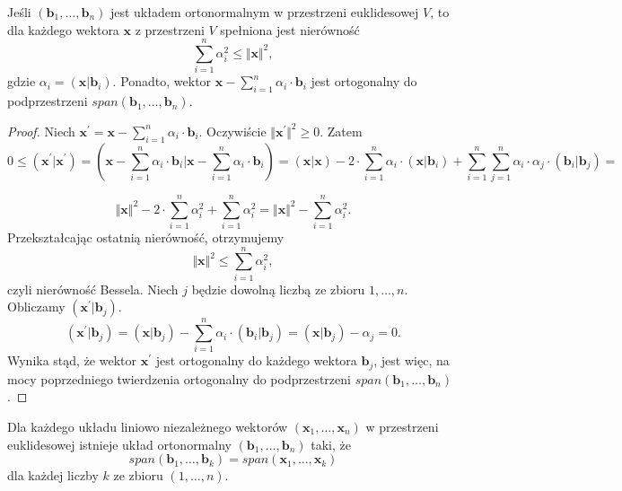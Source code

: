 \documentclass[12pt,a4paper]{report}
\newcommand{\vr}[1]{\mathbf{#1}}
\begin{document}
\begin{theorem} \label{Nierówność-Bessela}
Jeśli $(\vr{b}_{1}, \ldots, \vr{b}_{n})$ jest układem ortonormalnym w przestrzeni euklidesowej $V$, to dla każdego wektora $\vr{x}$ z przestrzeni $V$ spełniona jest nierówność 
$$
\sum_{i=1}^{n}\alpha_{i}^{2}\leq \Vert\vr{x}\Vert^{2},
$$
gdzie $\alpha_{i} = (\vr{x}|\vr{b}_{i})$. Ponadto, wektor $\vr{x} - \sum_{i=1}^{n} \alpha_{i} \cdot \vr{b}_{i}$ jest ortogonalny do podprzestrzeni $span(\vr{b}_{1}, \ldots, \vr{b}_{n})$.

\begin{proof}
Niech $\vr{x}^{'} = \vr{x} -\sum_{i=1}^{n} \alpha_{i} \cdot \vr{b}_{i}$. Oczywiście $\Vert \vr{x}^{'} \Vert^{2} \geq 0$. Zatem
$$
0\leq (\vr{x}^{'}|\vr{x}^{'}) = (\vr{x} - \sum_{i=1}^{n} \alpha_{i} \cdot \vr{b}_{i} | \vr{x} - \sum_{i=1}^{n} \alpha_{i} \cdot \vr{b}_{i}) = (\vr{x}|\vr{x}) - 2\cdot \sum_{i=1}^{n} \alpha_{i}\cdot(\vr{x}|\vr{b}_{i}) + \sum_{i=1}^{n}\sum_{j=1}^{n} \alpha_{i}\cdot\alpha_{j}\cdot(\vr{b}_{i}|\vr{b}_{j}) =
$$

$$
\Vert\vr{x}\Vert^{2} - 2\cdot\sum_{i=1}^{n}\alpha_{i}^{2} + \sum_{i=1}^{n}\alpha_{i}^{2} = \Vert \vr{x} \Vert^{2} - \sum_{i=1}^{n}\alpha_{i}^{2}.
$$
Przekształcając ostatnią nierówność, otrzymujemy
$$
\Vert\vr{x}\Vert^{2} \leq \sum_{i=1}^{n}\alpha_{i}^{2},
$$
czyli nierówność Bessela.
Niech $j$ będzie dowolną liczbą ze zbioru ${1, \ldots, n}$. Obliczamy $(\vr{x}^{'}|\vr{b}_{j})$.
$$
(\vr{x}^{'}|\vr{b}_{j}) = (\vr{x}|\vr{b}_{j}) - \sum_{i=1}^{n}\alpha_{i}\cdot(\vr{b}_{i}|\vr{b}_{j}) = (\vr{x}|\vr{b}_{j}) - \alpha_{j} = 0.
$$
Wynika stąd, że wektor $\vr{x}^{'}$ jest ortogonalny do każdego wektora $\vr{b}_{j}$, jest więc, na mocy poprzedniego twierdzenia ortogonalny do podprzestrzeni $span(\vr{b}_{1}, \ldots, \vr{b}_{n})$.
\end{proof}

\end{theorem}

\begin{theorem} \label{theorem-gram-schmidt}
Dla każdego układu liniowo niezależnego wektorów $(\vr{x}_{1},\ldots,\vr{x}_{n})$ w przestrzeni euklidesowej istnieje układ ortonormalny $(\vr{b}_{1},\ldots, \vr{b}_{n})$ taki, że 
$$
span(\vr{b}_{1},\ldots, \vr{b}_{k}) = span(\vr{x}_{1},\ldots, \vr{x}_{k})
$$
dla każdej liczby $k$ ze zbioru $(1,\ldots,n)$.
\end{theorem}
\end{document}
